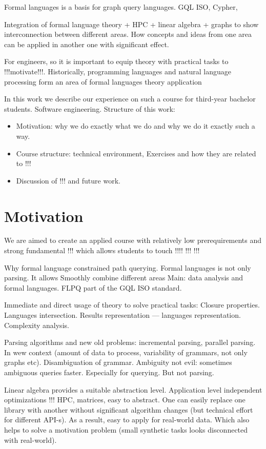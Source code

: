 \documentclass[sigconf]{acmart}
\begin{document}
Formal languages is a basis for graph query languages. 
GQL ISO, Cypher, 

Integration of formal language theory + HPC + linear algebra + graphs to show interconnection between different areas. How concepts and ideas from one area can be applied in another one with significant effect. 

For engineers, so it is important to equip theory with practical tasks to !!!motivate!!!. Historically, programming languages and natural language processing form an area of formal languages theory application 

In this work we describe our experience on such a course for third-year bachelor students.
Software engineering.
Structure of this work:
\begin{itemize}
  \item Motivation: why we do exactly what we do and why we do it exactly such a way. 
  \item Course structure: technical environment, Exercises and how they are related to !!!
  \item Discussion of !!! and future work.
\end{itemize}  

\section{Motivation}

We are aimed to create an applied course with relatively low prerequirements and strong fundamental !!! which allows students to touch !!!! !!! !!!

Why formal language constrained path querying. 
Formal languages is not only parsing. 
It allows Smoothly combine different areas 
Main: data analysis and formal languages.
FLPQ part of the GQL ISO standard.

Immediate and direct usage of theory to solve practical tasks: Closure properties.
Languages intersection.
Results representation --- languages representation.
Complexity analysis.

Parsing algorithms and new old problems: incremental parsing, parallel parsing. In wew context (amount of data to process, variability of grammars, not only graphs etc).
Disambiguation of grammar.
Ambiguity not evil: sometimes ambiguous queries faster.
Especially for querying.
But not parsing.

Linear algebra provides a suitable abstraction level. Application level independent optimizations !!! HPC, matrices, easy to abstract.
One can easily replace one library with another without significant algorithm changes (but technical effort for different API-s).
As a result, easy to apply for real-world data.
Which also helps to solve a motivation problem (small synthetic tasks looks disconnected with real-world).
\end{document}
